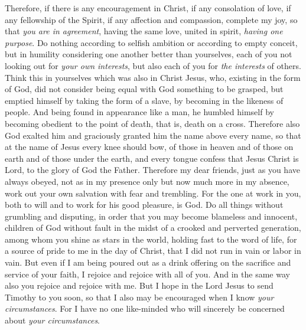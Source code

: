 \begin{biblechapter} %
 Therefore, if there is any encouragement in Christ, if any consolation of love, if any fellowship of the Spirit, if any affection and compassion,
\verse complete my joy, so that \textit{you are in agreement}, having the same love, united in spirit, \textit{having one purpose}.
\verse Do nothing according to selfish ambition or according to empty conceit, but in humility considering one another better than yourselves,
\verse each of you not looking out for \textit{your own interests}, but also each of you for \textit{the interests} of others.
 Think this in yourselves which was also in Christ Jesus,
\verse who, existing in the form of God, 
did not consider being equal with God something to be grasped,
\verse but emptied himself 
by taking the form of a slave, 
by becoming in the likeness of people. 
And being found in appearance like a man,
\verse he humbled himself 
by becoming obedient to the point of death, 
that is, death on a cross.
\verse Therefore also God exalted him 
and graciously granted him the name above every name,
\verse so that at the name of Jesus 
every knee should bow, 
of those in heaven and of those on earth and of those under the earth,
\verse and every tongue confess 
that Jesus Christ is Lord, 
to the glory of God the Father.
 Therefore my dear friends, just as you have always obeyed, not as in my presence only but now much more in my absence, work out your own salvation with fear and trembling.
\verse For the one at work in you, both to will and to work for his good pleasure, is God.
\verse Do all things without grumbling and disputing,
\verse in order that you may become blameless and innocent, children of God without fault in the midst of a crooked and perverted generation, among whom you shine as stars in the world,
\verse holding fast to the word of life, for a source of pride to me in the day of Christ, that I did not run in vain or labor in vain.
\verse But even if I am being poured out as a drink offering on the sacrifice and service of your faith, I rejoice and rejoice with all of you.
\verse And in the same way also you rejoice and rejoice with me.
 But I hope in the Lord Jesus to send Timothy to you soon, so that I also may be encouraged when I know \textit{your circumstances}.
\verse For I have no one like-minded who will sincerely be concerned about \textit{your circumstances}.

\end{biblechapter}
